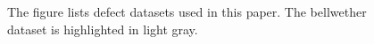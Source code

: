 \begin{figure}[!t]
\begin{minipage}{0.75\linewidth}
{\begin{tabular}{l|r|r|r}
\end{tabular}%
}
\end{minipage}
\caption{The figure lists defect datasets used in this paper. The bellwether dataset is highlighted in \colorbox{lavenderpink}{light gray}.}
\label{fig:datasets}
\end{figure}
